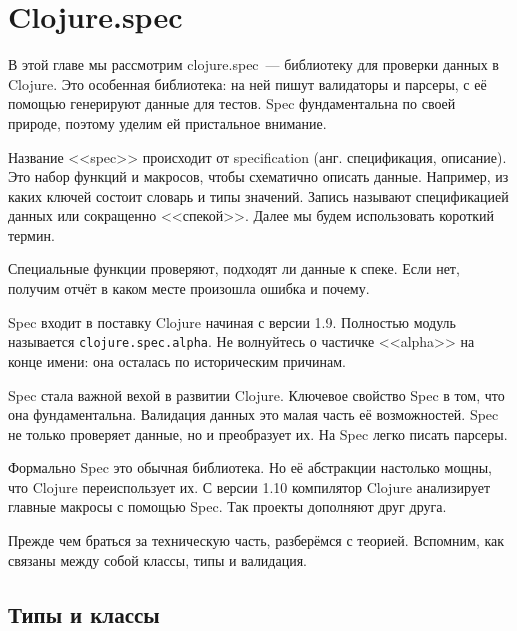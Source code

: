\chapter{Clojure.spec}

\label{chapter-spec}


\begin{teaser}
В этой главе мы рассмотрим clojure.spec~--- библиотеку для проверки данных в
Clojure. Это особенная библиотека: на ней пишут валидаторы и парсеры, с её
помощью генерируют данные для тестов. Spec фундаментальна по своей природе,
поэтому уделим ей пристальное внимание.
\end{teaser}

Название <<spec>> происходит от specification (анг. спецификация, описание). Это
набор функций и макросов, чтобы схематично описать данные. Например, из каких
ключей состоит словарь и типы значений. Запись называют спецификацией данных или
сокращенно <<спекой>>. Далее мы будем использовать короткий термин.

Специальные функции проверяют, подходят ли данные к спеке. Если нет, получим
отчёт в каком месте произошла ошибка и почему.


Spec входит в поставку Clojure начиная с версии 1.9. Полностью модуль называется
\verb|clojure.spec.alpha|. Не волнуйтесь о частичке <<alpha>> на конце
имени: она осталась по историческим причинам.


Spec стала важной вехой в развитии Clojure. Ключевое свойство Spec в том, что
она фундаментальна. Валидация данных это малая часть её возможностей. Spec
не только проверяет данные, но и преобразует их. На Spec легко писать парсеры.

Формально Spec это обычная библиотека. Но её абстракции настолько мощны, что
Clojure переиспользует их. С версии 1.10 компилятор Clojure анализирует главные
макросы с помощью Spec. Так проекты дополняют друг друга.

Прежде чем браться за техническую часть, разберёмся с теорией. Вспомним, как
связаны между собой классы, типы и валидация.

\section{Типы и классы}

\label{type-and-pred}

